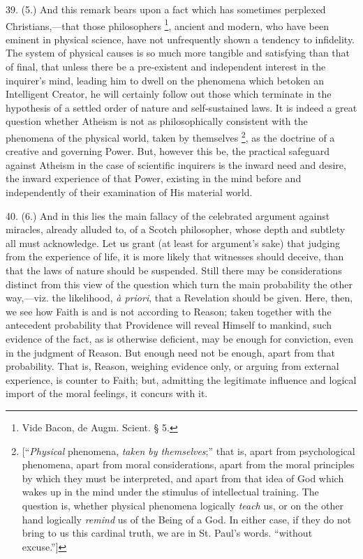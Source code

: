 39. (5.) And this remark bears upon a fact which has sometimes
perplexed Christians,—that those philosophers \footnote{Vide Bacon, de
Augm. Scient. § 5.}, ancient and modern, who have been eminent in physical science,
have not unfrequently shown a tendency to infidelity. The system of
physical causes is so much more tangible and satisfying than that of
final, that unless there be a pre-existent and independent interest in
the inquirer's mind, leading him to dwell on the phenomena which
betoken an Intelligent Creator, he will certainly follow out those
which terminate in the hypothesis of a settled order of nature and
self-sustained laws. It is indeed a great question whether Atheism is
not as philosophically consistent with the phenomena of the physical
world, taken by themselves \footnote{[``\emph{Physical}
phenomena, \emph{taken by themselves};'' that is, apart from
psychological phenomena, apart from moral considerations, apart from
the moral principles by which they must be interpreted, and apart from
that idea of God which wakes up in the mind under the stimulus of
intellectual training. The question is, whether physical phenomena
logically \emph{teach} us, or on the other hand logically \emph{remind}
us of the Being of a God. In either case, if they do not bring to us
this cardinal truth, we are in St. Paul's words. ``without
excuse.'']},
as the doctrine of a creative and governing Power. But, however this
be, the practical safeguard against Atheism in the case of scientific
inquirers is the inward need and desire, the inward experience of that
Power, existing in the mind before and independently of their
examination of His material world.

40. (6.) And in this lies the main fallacy of the celebrated
argument against miracles, already alluded to, of a Scotch
philosopher, whose depth and subtlety all must acknowledge. Let us
grant (at least for argument's sake) that judging from the experience
of life, it is more likely that witnesses should deceive, than that
the laws of nature should be suspended. Still there may be
considerations distinct from this view of the question which turn the
main probability the other way,—viz. the likelihood, \emph{à priori},
that a Revelation should be given. Here, then, we see how Faith is and
is not according to Reason; taken together with the antecedent
probability that Providence will reveal Himself to mankind, such
evidence of the fact, as is otherwise deficient, may be enough for
conviction, even in the judgment of Reason. But enough need not be
enough, apart from that probability. That is, Reason, weighing
evidence only, or arguing from external experience, is counter to
Faith; but, admitting the legitimate influence and logical import of
the moral feelings, it concurs with it.

